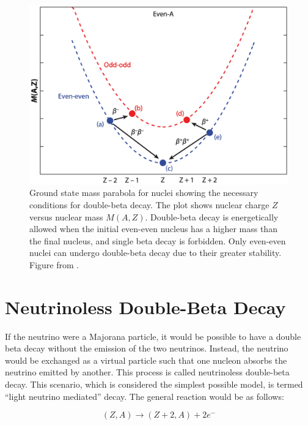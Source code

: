 \begin{figure}[!htb]
\centering
\includegraphics[width=0.8\linewidth]{ch1/figs/2nbb_cond.png}
\caption{Ground state mass parabola for nuclei showing the necessary conditions for double-beta decay. The plot shows nuclear charge \(Z\) versus nuclear mass \(M(A,Z)\). Double-beta decay is energetically allowed when the initial even-even nucleus has a higher mass than the final nucleus, and single beta decay is forbidden. Only even-even nuclei can undergo double-beta decay due to their greater stability. Figure from \cite{2nbb_cond}.}
\label{2nbb_cond}

\end{figure}

\section{Neutrinoless Double-Beta Decay}
If the neutrino were a Majorana particle, it would be possible to have a double beta decay without the emission of the two neutrinos. Instead, the neutrino would be exchanged as a virtual particle such that one nucleon absorbs the neutrino emitted by another. This process is called neutrinoless double-beta decay. This scenario, which is considered the simplest possible model, is termed ``light neutrino mediated'' decay. The general reaction would be as follows:

\begin{equation}\label{0nbeta_decay_eq}
(Z,A) \rightarrow (Z+2,A) + 2e^-
\end{equation}




